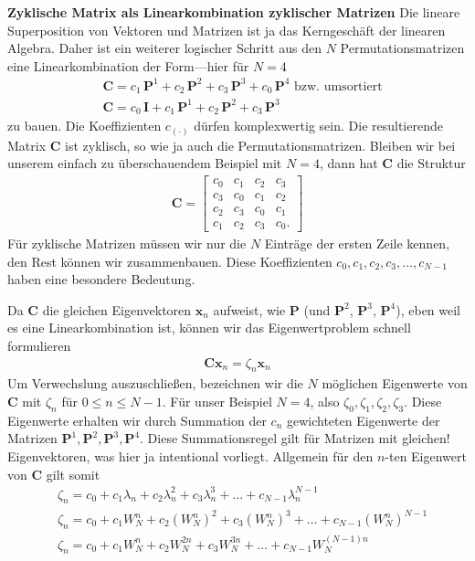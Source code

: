 \textbf{Zyklische Matrix als Linearkombination zyklischer Matrizen}
Die lineare Superposition von Vektoren und Matrizen ist ja das Kerngeschäft
der linearen Algebra.
Daher ist ein weiterer logischer Schritt aus den $N$
Permutationsmatrizen eine Linearkombination der Form---hier für $N=4$
\begin{align}
&\bm{C} = c_1 \, \bm{P}^1 + c_2 \, \bm{P}^2 + c_3 \, \bm{P}^3 + c_0 \, \bm{P}^4\text{ bzw. umsortiert}\nonumber\\
&\bm{C} = c_0 \, \bm{I} + c_1 \, \bm{P}^1 + c_2 \, \bm{P}^2 + c_3 \, \bm{P}^3
\end{align}
zu bauen.
Die Koeffizienten $c_{(\cdot)}$ dürfen komplexwertig sein. Die resultierende
Matrix $\bm{C}$ ist zyklisch, so wie ja auch die Permutationsmatrizen.
Bleiben wir bei unserem einfach zu überschauendem Beispiel mit $N=4$, dann hat
$\bm{C}$ die Struktur
%
\begin{align}
\bm{C}=
\begin{bmatrix}
c_0& c_1& c_2& c_3\\
c_3& c_0& c_1& c_2\\
c_2& c_3& c_0& c_1\\
c_1& c_2& c_3& c_0.
\end{bmatrix}
\end{align}
Für zyklische Matrizen müssen wir nur die $N$ Einträge der ersten Zeile kennen,
den Rest können wir zusammenbauen. Diese Koeffizienten $c_0,c_1, c_2, c_3,\dots, c_{N-1}$
haben eine besondere Bedeutung.

Da $\bm{C}$ die gleichen Eigenvektoren $\bm{x}_n$ aufweist, wie $\bm{P}$
(und $\bm{P}^2$, $\bm{P}^3$, $\bm{P}^4$), eben weil es eine Linearkombination
ist, können wir das Eigenwertproblem schnell formulieren
\begin{align}
\bm{C} \bm{x}_n = \zeta_n \bm{x}_n
\end{align}
Um Verwechslung auszuschließen, bezeichnen wir die $N$ möglichen
Eigenwerte von $\bm{C}$ mit $\zeta_n$ für $0\leq n \leq N-1$.
%
Für unser Beispiel $N=4$, also $\zeta_0, \zeta_1, \zeta_2, \zeta_3$.
%
Diese Eigenwerte erhalten wir durch Summation der $c_n$ gewichteten Eigenwerte
der Matrizen $\bm{P}^1, \bm{P}^2, \bm{P}^3, \bm{P}^4$.
Diese Summationsregel gilt für Matrizen mit gleichen! Eigenvektoren, was hier
ja intentional vorliegt. Allgemein für den $n$-ten Eigenwert von $\bm{C}$
gilt somit
\begin{align}
&\zeta_n = c_0 + c_1 \lambda_n + c_2 \lambda_n^2 + c_3 \lambda_n^3 + \dots + c_{N-1} \lambda_n^{N-1}\\
&\zeta_n = c_0 + c_1 W_N^n + c_2 (W_N^n)^2 + c_3 (W_N^n)^3 + \dots + c_{N-1} (W_N^n)^{N-1}\\
&\zeta_n = c_0 + c_1 W_N^n + c_2 W_N^{2n} + c_3 W_N^{3n} + \dots + c_{N-1} W_N^{(N-1) n}
\end{align}

